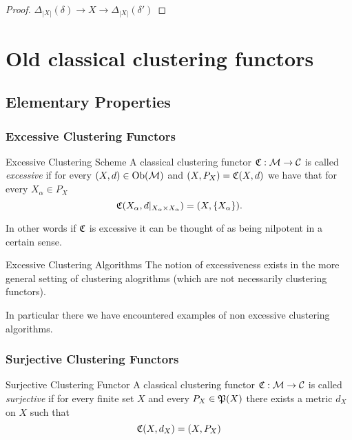 \begin{proof}
    $\Delta_{|X|}(\delta) \to X \to \Delta_{|X|}(\delta')$
\end{proof}


\chapter*{Old classical clustering functors}


\section{Elementary Properties}
\subsection{Excessive Clustering Functors}
\begin{definition}{Excessive Clustering Scheme}{}
A classical clustering functor $\Cf: \M \to \C$ is called \emph{excessive} if for every $(X,d) \in \ob(\M)$ and $(X,P_X) = \Cf(X,d)$ we have that for every $X_\alpha \in P_X$
\begin{equation*}
    \Cf(X_\alpha, d|_{X_\alpha \times X_\alpha}) = (X,\{X_\alpha\}).
\end{equation*}
\end{definition}
In other words if $\Cf$ is excessive it can be thought of as being nilpotent in a certain sense.

\begin{myremark}{Excessive Clustering Algorithms}{}
The notion of excessiveness exists in the more general setting of clustering alogrithms (which are not necessarily clustering functors).
\end{myremark}

In particular there we have encountered examples of non excessive clustering algorithms.



\subsection{Surjective Clustering Functors}
\begin{definition}{Surjective Clustering Functor}{}
A classical clustering functor $\Cf: \M \to \C$ is called \emph{surjective} if for every finite set $X$ and every $P_X \in \P(X)$ there exists a metric $d_X$ on $X$ such that
\begin{equation*}
    \Cf(X,d_X) = (X,P_X)
\end{equation*}
\end{definition}

